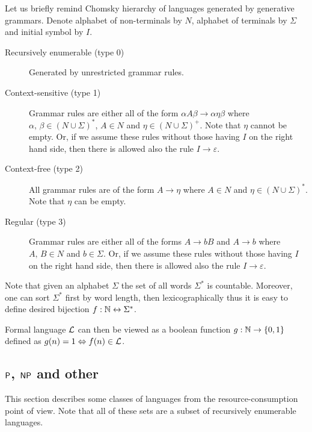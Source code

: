 		Let us briefly remind Chomsky hierarchy of languages generated by generative grammars. Denote alphabet of non-terminals by $N$, alphabet of terminals by $\Sigma$ and initial symbol by $I$.
		\begin{description}
			\item[Recursively enumerable (type 0)] Generated by unrestricted grammar rules.
			\item[Context-sensitive (type 1)] Grammar rules are either all of the form $\alpha A \beta \rightarrow \alpha \eta \beta$ where $\alpha,\,\beta\in (N\cup\Sigma)^*$, $A\in N$ and $\eta\in (N\cup\Sigma)^+$. Note that $\eta$ cannot be empty. Or, if we assume these rules without those having $I$ on the right hand side, then there is allowed also the rule $I\rightarrow \varepsilon$.
			\item[Context-free (type 2)] All grammar rules are of the form $A\rightarrow\eta$ where $A\in N$ and $\eta\in (N\cup\Sigma)^*$. Note that $\eta$ can be empty.
			\item[Regular (type 3)] Grammar rules are either all of the forms $A\rightarrow bB$ and $A\rightarrow b$ where $A,\,B\in N$ and $b\in\Sigma$. Or, if we assume these rules without those having $I$ on the right hand side, then there is allowed also the rule $I\rightarrow \varepsilon$.
		\end{description}
		
		\begin{remark}
			Note that given an alphabet $\Sigma$ the set of all words $\Sigma^*$ is countable. Moreover, one can sort $\Sigma^*$ first by word length, then lexicographically thus it is easy to define desired bijection $f: \N \leftrightarrow \Sigma^* $.
			
			Formal language ${\cal L}$ can then be viewed as a boolean function $g: \N \rightarrow \{0,1\}$ defined as
			$g(n) = 1 \iff f(n)\in {\cal L}$.
		\end{remark}
		
	
	\subsection{$\P$, $\NP$ and other}
	\label{sec:PNP}
		
		This section describes some classes of languages from the resource-consumption point of view. Note that all of these sets are a subset of recursively enumerable languages.
		
